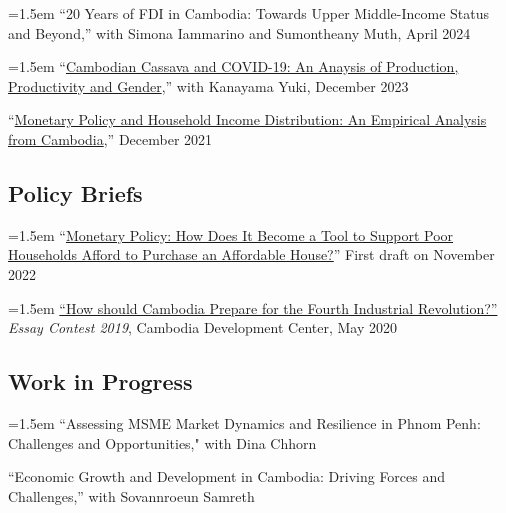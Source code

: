 \documentclass[10pt,a4paper]{article}
\begin{document}
		\hangindent=1.5em
	``20 Years of FDI in Cambodia: Towards Upper Middle-Income Status and Beyond,'' with Simona Iammarino and Sumontheany Muth, April 2024 \\ \vspace{-.5em}
	
	\hangindent=1.5em
	“\href{}{Cambodian Cassava and COVID-19: An Anaysis of Production, Productivity and Gender},” with Kanayama Yuki, December 2023\\ \vspace{-.5em}
	
	“\href{https://kosalnith.github.io/research/papers/MPHI.pdf}{Monetary Policy and Household Income Distribution: An Empirical Analysis from Cambodia},” December 2021 

\subsection*{Policy Briefs}
	
		\hangindent=1.5em
		“\href{}{Monetary Policy: How Does It Become a Tool to Support Poor Households Afford to Purchase an Affordable House?}” First draft on November 2022 \\ \vspace{-.5em}
	
		\hangindent=1.5em
		\href{https://cd-center.org/en/essay-contest-2019-first-place-winner/}{``How should Cambodia Prepare for the Fourth Industrial Revolution?''} \textit{Essay Contest 2019}, Cambodia Development Center, May 2020

\subsection*{Work in Progress}
	\hangindent=1.5em
	``Assessing MSME Market Dynamics and Resilience in Phnom Penh: Challenges and Opportunities," with Dina Chhorn\\ \vspace{-.5em}
	
	``Economic Growth and Development in Cambodia: Driving Forces and Challenges,'' with Sovannroeun Samreth\\ \vspace{-.5em}
	
\end{document}
